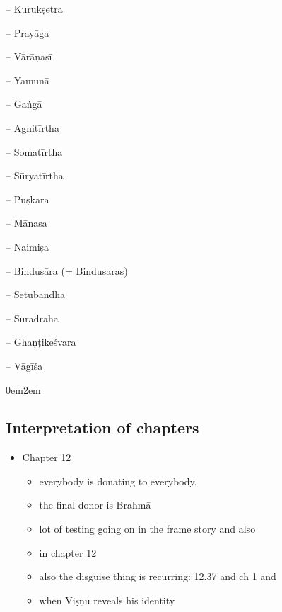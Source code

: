 \documentclass[11pt]{book}
\begin{document}
	-- Kurukṣetra
	
	-- Prayāga
	
	-- Vārāṇasī
 	
 	-- Yamunā
 	
 	-- Gaṅgā
 	
 	-- Agnitīrtha %
 	
 	-- Somatīrtha %
 	
 	-- Sūryatīrtha %
 	
 	-- Puṣkara %
 	
 	-- Mānasa %
    
    -- Naimiṣa %
    
    -- Bindusāra (= Bindusaras) %
    
    -- Setubandha %
    
    -- Suradraha %
    
    -- Ghaṇṭikeśvara
    
    -- Vāgīśa





\leftskip0em\parindent2em


\vfill
\pagebreak




\subsection{Interpretation of chapters}

\begin{itemize}

\item
  Chapter 12

  \begin{itemize}
  
  \item
    everybody is donating to everybody,
  \item
    the final donor is Brahmā
  \item
    lot of testing going on in the frame story and also
  \item
    in chapter 12
  \item
    also the disguise thing is recurring: 12.37 and ch 1 and
  \item
    when Viṣṇu reveals his identity
  \end{itemize}
\end{itemize}
\end{document}
